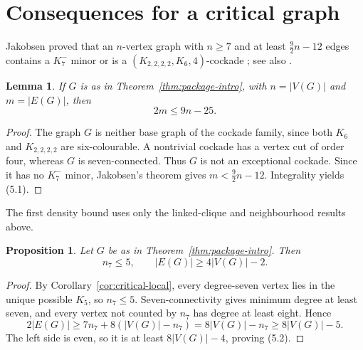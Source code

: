\documentclass[11pt]{amsart}
\newtheorem{lemma}[theorem]{Lemma}
\newtheorem{proposition}[theorem]{Proposition}
\begin{document}
\section{Consequences for a critical graph}

Jakobsen proved that an $n$-vertex
graph with $n\geq7$ and at least $\frac92n-12$ edges contains a
$K_7^{-}$ minor or is a $(K_{2,2,2,2},K_6,4)$-cockade
\cite[Theorem~4]{Jakobsen1983}; see also \cite[Theorem~2]{Albar2014}.

\begin{lemma}\label{lem:jakobsen-defect}
If $G$ is as in Theorem~\ref{thm:package-intro}, with $n=|V(G)|$ and
$m=|E(G)|$, then
\[
        2m\leq9n-25.                                    \tag{5.1}
\]
\end{lemma}

\begin{proof}
The graph $G$ is neither base graph of the cockade family, since both
$K_6$ and $K_{2,2,2,2}$ are six-colourable.  A nontrivial cockade has a
vertex cut of order four, whereas $G$ is seven-connected.  Thus $G$ is not
an exceptional cockade.  Since it has no $K_7^{-}$ minor, Jakobsen's
theorem gives $m<\frac92n-12$.  Integrality yields (5.1).
\end{proof}

The first density bound uses only the linked-clique and neighbourhood
results above.

\begin{proposition}\label{prop:preliminary-density}
Let $G$ be as in Theorem~\ref{thm:package-intro}.  Then
\[
        n_7\leq5,
        \qquad |E(G)|\geq4|V(G)|-2.                     \tag{5.2}
\]
\end{proposition}

\begin{proof}
By Corollary~\ref{cor:critical-local}, every degree-seven vertex lies in
the unique possible $K_5$, so $n_7\leq5$.  Seven-connectivity gives
minimum degree at least seven, and every vertex not counted by $n_7$ has
degree at least eight.  Hence
\[
        2|E(G)|\geq7n_7+8(|V(G)|-n_7)
                  =8|V(G)|-n_7
                  \geq8|V(G)|-5.
\]
The left side is even, so it is at least $8|V(G)|-4$, proving (5.2).
\end{proof}
\end{document}
